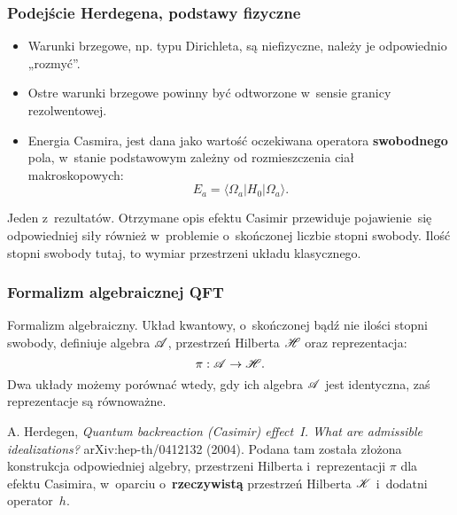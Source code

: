 \documentclass[10pt,t]{beamer}
\begin{document}
\begin{frame}
  \frametitle{Podejście Herdegena, podstawy fizyczne}


  \begin{itemize}
    \RaggedRight

  \item Warunki brzegowe, np. typu Dirichleta, są niefizyczne,
    należy je odpowiednio „rozmyć”.

  \item Ostre warunki brzegowe powinny być odtworzone w~sensie
    granicy rezolwentowej.

  \item Energia Casmira, jest dana jako wartość oczekiwana operatora
    \textbf{swobodnego} pola, w~stanie podstawowym zależny od
    rozmieszczenia ciał makroskopowych:
    \begin{equation}
      \label{eq:Efekt-Casimira-09}
      E_{ a } = \langle \Omega_{ a } | H_{ 0 } | \Omega_{ a } \rangle.
    \end{equation}

  \end{itemize}



  Jeden z~rezultatów. Otrzymane opis efektu Casimir przewiduje
  pojawienie~się odpowiedniej siły również w~problemie o~skończonej
  liczbie stopni swobody. Ilość stopni swobody tutaj, to wymiar
  przestrzeni układu klasycznego.

\end{frame}





\begin{frame}
  \frametitle{Formalizm algebraicznej QFT}


  Formalizm algebraiczny. Układ kwantowy, o~skończonej bądź nie ilości
  stopni swobody, definiuje algebra $\mathcal{A}$, przestrzeń Hilberta $\mathcal{H}$
  oraz reprezentacja:
  \begin{equation}
    \label{eq:Efekt-Casimira-10}
    \pi: \mathcal{A} \to \mathcal{H}.
  \end{equation}
  Dwa układy możemy porównać wtedy, gdy ich algebra $\mathcal{A}$ jest
  identyczna, zaś reprezentacje są równoważne.



  A. Herdegen, \textit{Quantum backreaction (Casimir) effect~I.
    What are admissible idealizations?} arXiv:hep-th/0412132 (2004).
  Podana tam została złożona konstrukcja odpowiedniej algebry,
  przestrzeni Hilberta i~reprezentacji $\pi$ dla efektu Casimira,
  w~oparciu o~\textbf{rzeczywistą} przestrzeń Hilberta $\mathcal{K}$ i~dodatni
  operator~$h$.

\end{frame}
\end{document}
